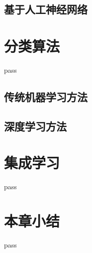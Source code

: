 
\subsection{基于人工神经网络}



\section{分类算法}

pass

\subsection{传统机器学习方法}


\subsection{深度学习方法}


\section{集成学习}

pass






\section{本章小结}

pass

